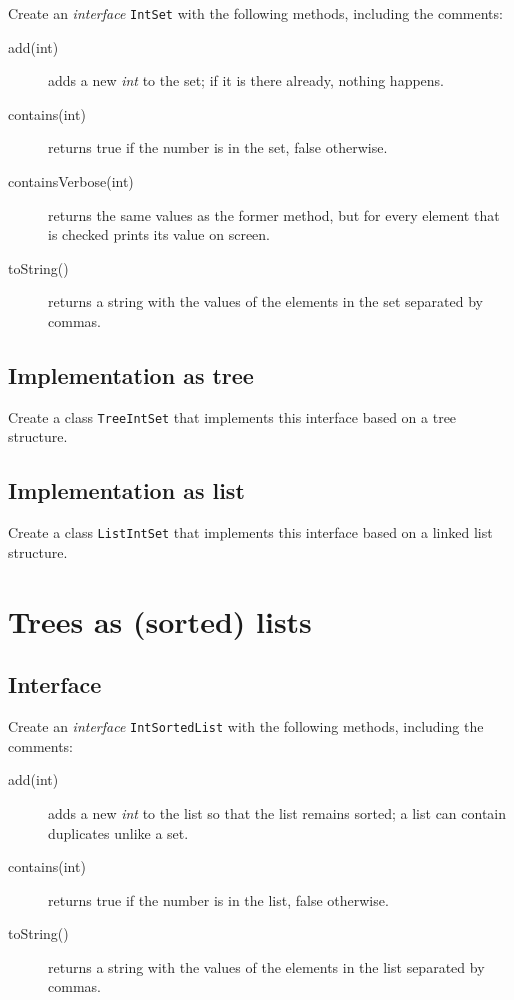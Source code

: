 \documentclass{article}
\begin{document}
Create an \emph{interface} \verb+IntSet+ with the following methods,
including the comments: 

\begin{description}
\item[add(int)] adds a new \emph{int} to the set; if it is there
  already, nothing happens.
\item[contains(int)] returns true if the number is in the set, false
  otherwise.
\item[containsVerbose(int)] returns the same values as the former
  method, but for every element that is checked prints its value on
  screen.
\item[toString()] returns a string with the values of the elements in
  the set separated by commas.
\end{description}

\subsection{Implementation as tree}
\label{sec:impl-as-tree1}

Create a class \verb+TreeIntSet+ that implements this interface based
on a tree structure. 

\subsection{Implementation as list}
\label{sec:impl-as-list1}

Create a class \verb+ListIntSet+ that implements this interface based
on a linked list structure. 


\section{Trees as (sorted) lists}
\label{sec:trees-as-lists}

\subsection{Interface}
\label{sec:interface}

Create an \emph{interface} \verb+IntSortedList+ with the following methods,
including the comments: 

\begin{description}
\item[add(int)] adds a new \emph{int} to the list so that the list
  remains sorted; a list can contain duplicates unlike a set.
\item[contains(int)] returns true if the number is in the list, false
  otherwise.
\item[toString()] returns a string with the values of the elements in
  the list separated by commas.
\end{description}
\end{document}
